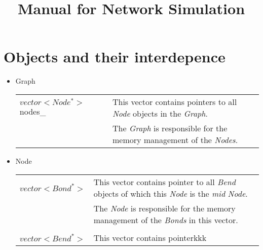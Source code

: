 \documentclass[pre,onecolumn]{revtex4-1}
\title{Manual for Network Simulation}
\begin{document}
\maketitle

\section{Objects and their interdepence}

\begin{itemize}
\item Graph \\
  \begin{tabular}{l|l}
  $vector<Node^*>$ nodes\_ \ \ & 
      This vector contains pointers to all
      \emph{Node} objects in the \emph{Graph}.
  \\
    & The \emph{Graph} is responsible for the memory management
      of the \emph{Nodes}.
  \end{tabular}
\item Node \\
  \begin{tabular}{l|l}
  $vector<Bond^*>$ &
      This vector contains pointer to all \emph{Bend} objects of which
      this \emph{Node} is the \emph{mid} \emph{Node}.
  \\
    & The \emph{Node} is responsible for the memory management
      of the \emph{Bonds} in this vector.
  \\
    &
  \\
  $vector<Bend^*>$ & 
      This vector contains pointerkkk
  \end{tabular}
\end{itemize}
\end{document}
